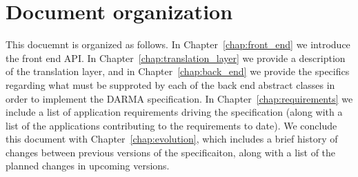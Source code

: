 








\section{Document organization}
\label{sec:organization}
This docuemnt is organized as follows.  In Chapter~\ref{chap:front_end} we
introduce the \gls{front end} \gls{API}.  In
Chapter~\ref{chap:translation_layer} we
provide a description of the \gls{translation layer}, and in
Chapter~\ref{chap:back_end} we provide the specifics regarding what must be
supproted by each of the \gls{back end} abstract classes in order to implement
the DARMA specification. In Chapter~\ref{chap:requirements} we include a list
of application requirements driving the specification (along with a list of the
    applications contributing to the requirements to date).
We conclude this document with
Chapter~\ref{chap:evolution}, which includes a brief history of changes between
previous versions of the specificaiton, along with a list of the planned changes 
in upcoming versions.

